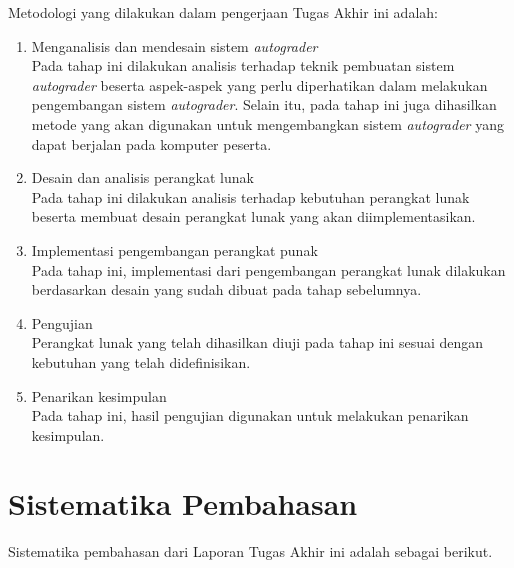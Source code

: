 \par Metodologi yang dilakukan dalam pengerjaan Tugas Akhir ini adalah:
\begin{enumerate}

	\item Menganalisis dan mendesain sistem \textit{autograder} \\ Pada tahap ini dilakukan analisis terhadap teknik pembuatan sistem \textit{autograder} beserta aspek-aspek yang perlu diperhatikan dalam melakukan pengembangan sistem \textit{autograder}. Selain itu, pada tahap ini juga dihasilkan metode yang akan digunakan untuk mengembangkan sistem \textit{autograder} yang dapat berjalan pada komputer peserta.
	
	\item Desain dan analisis perangkat lunak \\ Pada tahap ini dilakukan analisis terhadap kebutuhan perangkat lunak beserta membuat desain perangkat lunak yang akan diimplementasikan.
	
	\item Implementasi pengembangan perangkat punak \\ Pada tahap ini, implementasi dari pengembangan perangkat lunak dilakukan berdasarkan desain yang sudah dibuat pada tahap sebelumnya.
	
	\item Pengujian \\ Perangkat lunak yang telah dihasilkan diuji pada tahap ini sesuai dengan kebutuhan yang telah didefinisikan.
	
	\item Penarikan kesimpulan \\ Pada tahap ini, hasil pengujian digunakan untuk melakukan penarikan kesimpulan.

\end{enumerate}

\section{Sistematika Pembahasan}

\par Sistematika pembahasan dari Laporan Tugas Akhir ini adalah sebagai berikut.

